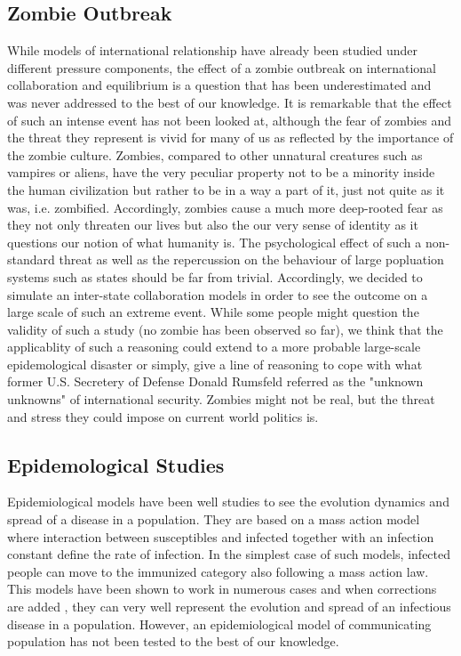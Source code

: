 \documentclass[11pt]{article} %
\begin{document}
\subsection{Zombie Outbreak}\indent

While models of international relationship have already been studied under different pressure components, the effect of a zombie outbreak on international collaboration and equilibrium is a question that has been underestimated and was never addressed to the best of our knowledge. It is remarkable that the effect of such an intense event has not been looked at, although the fear of zombies and the threat they represent is vivid for many of us as reflected by the importance of the zombie culture. Zombies, compared to other unnatural creatures such as vampires or aliens, have the very peculiar property not to be a minority inside the human civilization but rather to be in a way a part of it, just not quite as it was, i.e. zombified. Accordingly, zombies cause a much more deep-rooted fear as they not only threaten our lives but also the our very sense of identity as it questions our notion of what humanity is. The psychological effect of such a non-standard threat as well as the repercussion on the behaviour of large popluation systems such as states should be far from trivial. Accordingly, we decided to simulate an inter-state collaboration models in order to see the outcome on a large scale of such an extreme event. While some people might question the validity of such a study (no zombie has been observed so far), we think that the applicablity of such a reasoning could extend to a more probable large-scale epidemological disaster or simply, give a line of reasoning to cope with what former U.S. Secretery of Defense Donald Rumsfeld referred as the "unknown unknowns" of international security. Zombies might not be real, but the threat and stress they could impose on current world politics is. \\

\subsection{Epidemological Studies}\indent

Epidemiological models have been well studies to see the evolution dynamics and spread of a disease in a population\cite{brauer2008compartmental}. They are based on a mass action model where interaction between susceptibles and infected together with an infection constant define the rate of infection. In the simplest case of such models, infected people can move to the immunized category also following a mass action law. This models have been shown to work in numerous cases and  when corrections are added \cite{m1925applications, stone2007seasonal}, they can very well represent the evolution and spread of an infectious disease in a population. However, an epidemiological model of communicating population has not been tested to the best of our knowledge. \\
\end{document}
